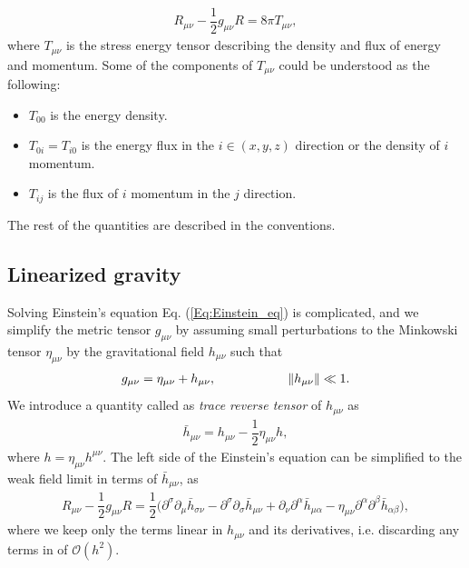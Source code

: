 \begin{align}
    R_{\mu \nu} - \dfrac{1}{2}g_{\mu \nu}R = 8\pi T_{\mu \nu},
    \label{Eq:Einstein_eq}
\end{align}
where $T_{\mu\nu}$ is the stress energy tensor describing the density and flux of energy and momentum. Some of the components of $T_{\mu\nu}$ could be understood as the following:
\begin{itemize}
    \item $T_{00}$ is the energy density.
    \item $T_{0i} = T_{i0}$ is the energy flux in the $i \in (x,y,z)$ direction or the density of $i$ momentum.
    \item $T_{ij}$ is the flux of $i$ momentum in the $j$ direction.
\end{itemize}
The rest of the quantities are described in the conventions.  

\subsection{Linearized gravity}
Solving Einstein's equation Eq. (\ref{Eq:Einstein_eq}) is complicated, and we simplify the metric tensor $g_{\mu\nu}$ by assuming small perturbations to the Minkowski tensor $\eta_{\mu\nu}$ by the gravitational field $h_{\mu\nu}$ such that
\begin{align}
    g_{\mu\nu} = \eta_{\mu\nu} + h_{\mu\nu},    \hspace{2cm}      \norm{h_{\mu\nu}} \ll 1.
\end{align}
We introduce a quantity called as \textit{trace reverse tensor} of $h_{\mu\nu}$ as
\begin{align}
    \bar{h}_{\mu\nu} = h_{\mu\nu} - \dfrac{1}{2}\eta_{\mu\nu}h,
\end{align}
where $h = \eta_{\mu\nu}h^{\mu\nu}$. The left side of the Einstein's equation can be simplified to the weak field limit in terms of $\bar{h}_{\mu\nu}$, as 
\begin{align}
    R_{\mu \nu} - \dfrac{1}{2}g_{\mu \nu}R = \dfrac{1}{2}\big( \partial^{\sigma}\partial_{\mu}\bar{h}_{\sigma\nu} -\partial^{\sigma}\partial_{\sigma}\bar{h}_{\mu\nu} + \partial_{\nu}\partial^{\alpha}\bar{h}_{\mu\alpha} - \eta_{\mu\nu}\partial^{\alpha}\partial^{\beta}\bar{h}_{\alpha\beta} \big),
\end{align}
where we keep only the terms linear in $h_{\mu\nu}$ and its derivatives, i.e. discarding any terms in of $\mathcal{O}(h^2)$.\\

